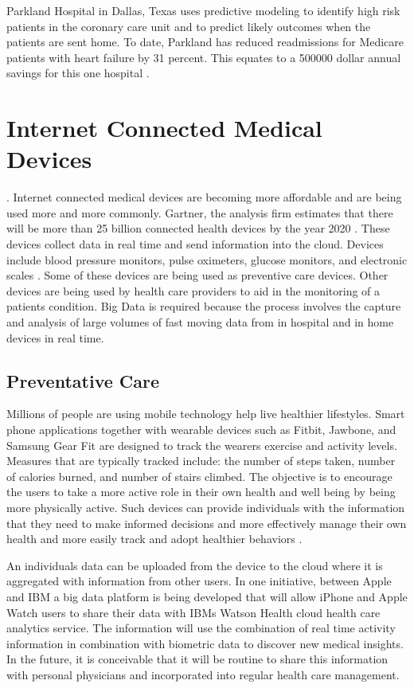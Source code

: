 \documentclass[sigconf]{acmart}
\begin{document}
{Parkland Hospital in Dallas, Texas uses predictive modeling to identify high risk patients in the coronary care unit and to predict likely outcomes when the patients are sent home. To date, Parkland has reduced readmissions for Medicare patients with heart failure by 31 percent. This equates to a 500000 dollar annual savings for this one hospital \cite{www-google-data}. 

\section{Internet Connected Medical Devices}. 
Internet connected medical devices are becoming more affordable and are being used more and more commonly.  Gartner, the analysis firm estimates that there will be more than 25 billion connected health devices by the year 2020 \cite{www-google-HlthCat}. These devices collect data in real time and send information into the cloud. Devices include blood pressure monitors, pulse oximeters, glucose monitors, and electronic scales \cite{www-google-HlthCat}.  Some of these devices are being used as preventive care devices. Other devices are being used by health care providers to aid in the monitoring of a patients condition.  Big Data is required because the process involves the capture and analysis of large volumes of fast moving data from in hospital and in home devices in real time.

\subsection{Preventative Care}
Millions of people are using mobile technology help live healthier lifestyles. Smart phone applications together with wearable devices such as Fitbit, Jawbone, and Samsung Gear Fit are designed to track the wearers exercise and activity levels. Measures that are typically tracked include: the number of steps taken, number of calories burned, and number of stairs climbed. The objective is to encourage the users to take a more active role in their own health and well being by being more physically active. Such devices can provide individuals with the information that they need to make informed decisions and more effectively manage their own health and more easily track and adopt healthier behaviors \cite{milbank}. 

An individuals data can be uploaded from the device to the cloud where it is aggregated with information from other users.  In one initiative, between Apple and IBM a big data platform is being developed that will allow iPhone and Apple Watch users to share their data with IBMs Watson Health cloud health care analytics service. The information will use the combination of real time activity information in combination with biometric data to discover new medical insights.  In the future, it is conceivable that it will be routine to share this information with personal physicians and incorporated into regular health care management.

}
\end{document}
